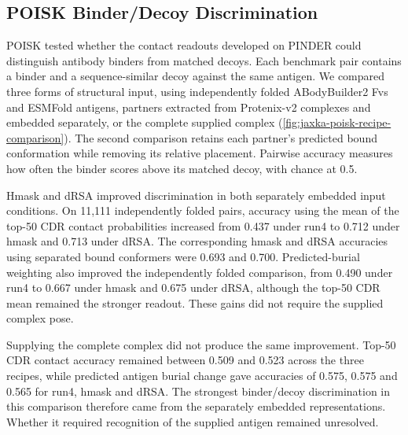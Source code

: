 \subsection{POISK Binder/Decoy Discrimination}
\label{sec:jaxka-poisk-results}

POISK tested whether the contact readouts developed on PINDER could distinguish antibody binders from matched decoys. Each benchmark pair contains a binder and a sequence-similar decoy against the same antigen. We compared three forms of structural input, using independently folded ABodyBuilder2 Fvs and ESMFold antigens, partners extracted from Protenix-v2 complexes and embedded separately, or the complete supplied complex (\cref{fig:jaxka-poisk-recipe-comparison}). The second comparison retains each partner's predicted bound conformation while removing its relative placement. Pairwise accuracy measures how often the binder scores above its matched decoy, with chance at 0.5.

Hmask and dRSA improved discrimination in both separately embedded input conditions. On 11,111 independently folded pairs, accuracy using the mean of the top-50 CDR contact probabilities increased from 0.437 under run4 to 0.712 under hmask and 0.713 under dRSA. The corresponding hmask and dRSA accuracies using separated bound conformers were 0.693 and 0.700. Predicted-burial weighting also improved the independently folded comparison, from 0.490 under run4 to 0.667 under hmask and 0.675 under dRSA, although the top-50 CDR mean remained the stronger readout. These gains did not require the supplied complex pose.

Supplying the complete complex did not produce the same improvement. Top-50 CDR contact accuracy remained between 0.509 and 0.523 across the three recipes, while predicted antigen burial change gave accuracies of 0.575, 0.575 and 0.565 for run4, hmask and dRSA. The strongest binder/decoy discrimination in this comparison therefore came from the separately embedded representations. Whether it required recognition of the supplied antigen remained unresolved.

